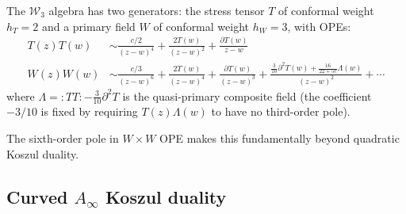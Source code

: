 \begin{example}\label{ex:w3-ope-structure}
The $\mathcal{W}_3$ algebra has two generators: the stress tensor $T$ of conformal weight $h_T = 2$ and a primary field $W$ of conformal weight $h_W = 3$, with OPEs:
\begin{align}
T(z)T(w) &\sim \frac{c/2}{(z-w)^4} + \frac{2T(w)}{(z-w)^2} + \frac{\partial T(w)}{z-w} \\
W(z)W(w) &\sim \frac{c/3}{(z-w)^6} + \frac{2T(w)}{(z-w)^4} + \frac{\partial T(w)}{(z-w)^3} + \frac{\frac{3}{10}\partial^2 T(w) + \frac{16}{22+5c}\Lambda(w)}{(z-w)^2} + \cdots
\end{align}
where $\Lambda = {:}TT{:} - \frac{3}{10}\partial^2 T$ is the quasi-primary composite field (the coefficient $-3/10$ is fixed by requiring $T(z)\Lambda(w)$ to have no third-order pole).

The sixth-order pole in $W \times W$ OPE makes this fundamentally beyond quadratic Koszul duality.
\end{example}

\subsection{\texorpdfstring{Curved $A_\infty$ Koszul duality}{Curved A-infinity Koszul duality}}

